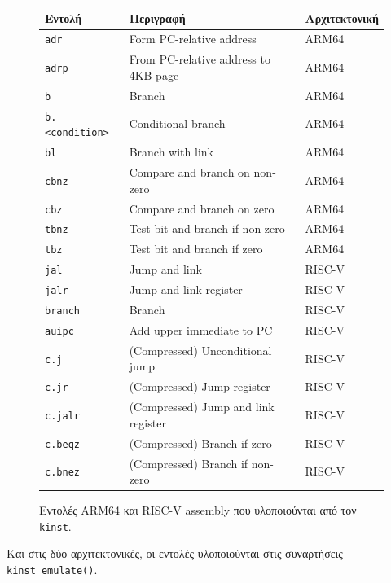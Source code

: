 \documentclass[12pt]{article}
\begin{document}
\begin{figure}[H]
\begin{center}
\begin{tabular}{|l|p{10cm}|l|}
	\hline
	\textbf{Εντολή} & \textbf{Περιγραφή} & \textbf{Αρχιτεκτονική} \\
	\hline
	\lstinline{adr} & Form PC-relative address & ARM64 \\
	\hline
	\lstinline{adrp} & From PC-relative address to 4KB page & ARM64 \\
	\hline
	\lstinline{b} & Branch & ARM64 \\
	\hline
	\lstinline{b.<condition>} & Conditional branch & ARM64 \\
	\hline
	\lstinline{bl} & Branch with link & ARM64 \\
	\hline
	\lstinline{cbnz} & Compare and branch on non-zero & ARM64 \\
	\hline
	\lstinline{cbz} & Compare and branch on zero & ARM64 \\
	\hline
	\lstinline{tbnz} & Test bit and branch if non-zero & ARM64 \\
	\hline
	\lstinline{tbz} & Test bit and branch if zero & ARM64 \\
	\hline
	\lstinline{jal} & Jump and link & RISC-V \\
	\hline
	\lstinline{jalr} & Jump and link register & RISC-V \\
	\hline
	\lstinline{branch} & Branch & RISC-V \\
	\hline
	\lstinline{auipc} & Add upper immediate to PC & RISC-V \\
	\hline
	\lstinline{c.j} & (Compressed) Unconditional jump & RISC-V \\
	\hline
	\lstinline{c.jr} & (Compressed) Jump register & RISC-V \\
	\hline
	\lstinline{c.jalr} & (Compressed) Jump and link register & RISC-V \\
	\hline
	\lstinline{c.beqz} & (Compressed) Branch if zero & RISC-V \\
	\hline
	\lstinline{c.bnez} & (Compressed) Branch if non-zero & RISC-V \\
	\hline
\end{tabular}
\end{center}
\caption{Εντολές ARM64 και RISC-V assembly που υλοποιούνται από τον \lstinline{kinst}.}
\label{emulateinstrs}
\end{figure}

Και στις δύο αρχιτεκτονικές, οι εντολές υλοποιούνται στις συναρτήσεις
\lstinline{kinst_emulate()}.
\end{document}
